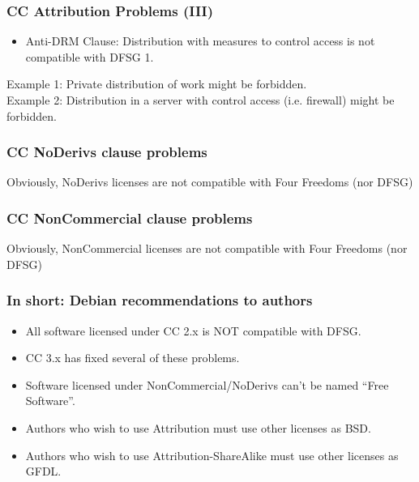 
\begin{frame}
\frametitle{CC Attribution Problems (III)}

\begin{itemize}
\item Anti-DRM Clause: Distribution with measures to control access is not compatible with DFSG 1.
\end{itemize}

Example 1: Private distribution of work might be forbidden.\\
Example 2: Distribution in a server with control access (i.e. firewall) might be forbidden.
\end{frame}


\begin{frame}
\frametitle{CC NoDerivs clause problems}

\LARGE{Obviously, NoDerivs licenses are not compatible with Four Freedoms (nor DFSG)}

\end{frame}


\begin{frame}
\frametitle{CC NonCommercial clause problems}

\LARGE{Obviously, NonCommercial licenses are not compatible with Four Freedoms (nor DFSG)}

\end{frame}



\begin{frame}
\frametitle{In short: Debian recommendations to authors}

\begin{itemize}
\item All software licensed under CC 2.x is NOT compatible with DFSG. 
\item CC 3.x has fixed several of these problems.
\item Software licensed under NonCommercial/NoDerivs can't be named ``Free Software''.
\item Authors who wish to use Attribution must use other licenses as BSD.
\item Authors who wish to use Attribution-ShareAlike must use other licenses as GFDL.
\end{itemize}

\end{frame}



